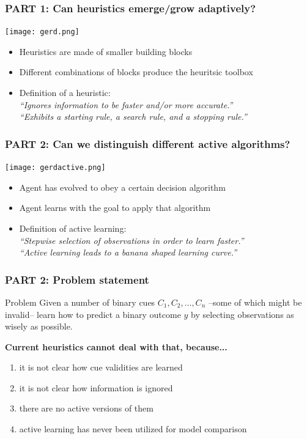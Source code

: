 \documentclass{beamer}
\begin{document}
\begin{frame}
 \frametitle{PART 1: Can heuristics emerge/grow adaptively?}
\vspace{-1cm}
\begin{center}
\texttt{[image: gerd.png]}
\end{center}
\begin{itemize}
\vspace{-0.5cm}
\item Heuristics are made of smaller building blocks
\item Different combinations of blocks produce the heuritsic toolbox 
\item Definition of a heuristic:\medskip\\
\emph{``Ignores information to be faster and/or more accurate.''}\medskip\\
\emph{``Exhibits a starting rule, a search rule, and a stopping rule.''}
\end{itemize}
\end{frame}




\begin{frame}
 \frametitle{PART 2: Can we distinguish different active algorithms?}
\vspace{-1cm}
\begin{center}
\texttt{[image: gerdactive.png]}
\end{center}
\begin{itemize}
\vspace{-0.5cm}
\item Agent has evolved to obey a certain decision algorithm
\item Agent learns with the goal to apply that algorithm 
\item Definition of active learning:\medskip\\
\emph{``Stepwise selection of observations in order to learn faster.''}\medskip\\
\emph{``Active learning leads to a banana shaped learning curve.''}
\end{itemize}
\end{frame}


\begin{frame}
 \frametitle{PART 2: Problem statement}
\begin{block}{Problem}
Given a number of binary cues $C_1, C_2, \dots, C_n$ --some of which might be invalid-- learn how to predict a binary outcome $y$ by selecting observations as wisely as possible.
\end{block}
\textbf{Current heuristics cannot deal with that, because...}
\begin{enumerate}
\item it is not clear how cue validities are learned
\item it is not clear how information is ignored
\item there are no active versions of them
\item active learning has never been utilized for model comparison
\end{enumerate}
\end{frame}
\end{document}
